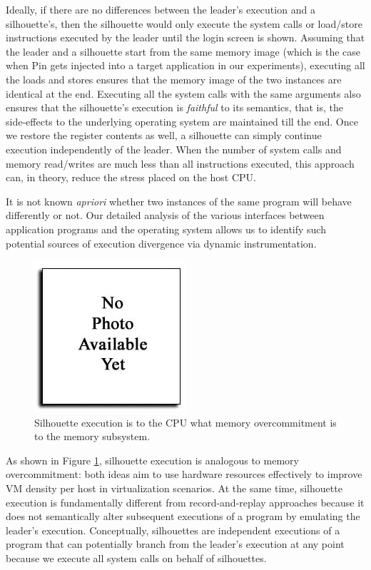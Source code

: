 Ideally, if there are no differences between the leader's
execution and a silhouette's, then the silhouette would only
execute the system calls or load/store instructions
executed by the leader until the login screen is shown.
Assuming that the leader and a silhouette start from the same
memory image (which is the case when Pin gets injected into
a target application in our experiments), executing all the loads and stores
ensures that the memory image of the two instances
are identical at the end. Executing all the system
calls with the same arguments also ensures
that the silhouette's execution is {\em faithful}
to its semantics, that is, the side-effects to the underlying
operating system are maintained till the end.
Once we restore the register contents
as well, a silhouette can simply continue
execution independently of the leader.
When the number of system calls and memory read/writes
are much less than all instructions executed,
this approach can, in theory, reduce the stress
placed on the host CPU. 

It is not known {\em apriori} whether
two instances of the same program will behave
differently or not.
Our detailed analysis of the various interfaces
between application programs and the operating system
allows us to identify such potential sources of
execution divergence via dynamic instrumentation.

\begin{figure}[h]
  \centering
  \includegraphics[scale=0.64, trim=1cm 0cm 1cm 0cm]{none.jpg}
  \caption[Silhouette execution is to the CPU what memory overcommitment
    is to the memory subsystem.]%
          {Silhouette execution is to the CPU what memory overcommitment
          is to the memory subsystem.}
  \label{silconcept}
\end{figure}


As shown in Figure \ref{silconcept},
silhouette execution is analogous
to memory overcommitment: both
ideas aim to use hardware
resources effectively to 
improve VM density per host
in virtualization scenarios.
At the same time,
silhouette execution is fundamentally different
from record-and-replay approaches because it
does not semantically alter subsequent executions
of a program by emulating the leader's execution. 
Conceptually, silhouettes are independent executions of a program
that can potentially branch from the leader's execution at any point
because we execute all system calls on behalf of silhouettes.

